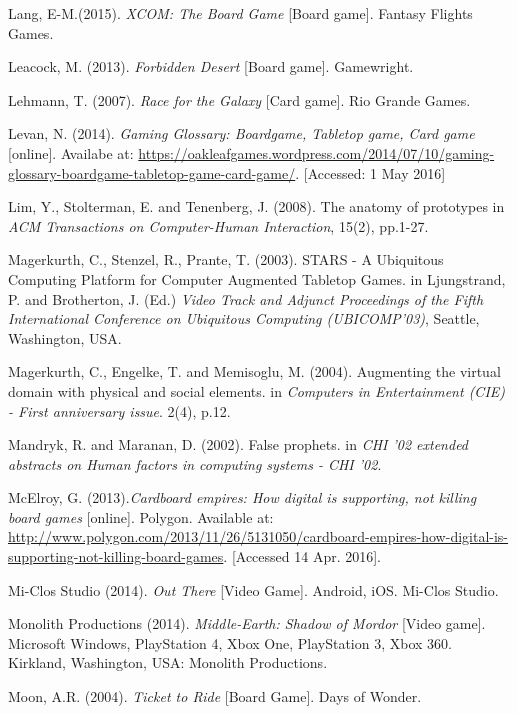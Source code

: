 \documentclass[a4paper,11pt]{report}
\begin{document}
\begin{thebibliography}{1}
Lang, E-M.(2015). \textit{XCOM: The Board Game} [Board game]. Fantasy Flights Games.

Leacock, M. (2013). \textit{Forbidden Desert} [Board game].  Gamewright.

Lehmann, T. (2007). \textit{Race for the Galaxy} [Card game]. Rio Grande Games.

Levan, N. (2014). \textit{Gaming Glossary: Boardgame, Tabletop game, Card game} [online]. Availabe at: \url{https://oakleafgames.wordpress.com/2014/07/10/gaming-glossary-boardgame-tabletop-game-card-game/}. [Accessed: 1 May 2016]

Lim, Y., Stolterman, E. and Tenenberg, J. (2008). The anatomy of prototypes in \textit{ACM Transactions on Computer-Human Interaction}, 15(2), pp.1-27.

Magerkurth, C., Stenzel, R., Prante, T. (2003). STARS - A Ubiquitous Computing Platform for Computer Augmented Tabletop Games. in Ljungstrand, P. and Brotherton, J. (Ed.) \textit{Video Track and Adjunct Proceedings of the Fifth
International Conference on Ubiquitous Computing (UBICOMP’03)}, Seattle, Washington, USA.

Magerkurth, C., Engelke, T. and Memisoglu, M. (2004). Augmenting the virtual domain with physical and social elements. in \textit{Computers in Entertainment (CIE) - First anniversary issue}. 2(4), p.12. 

Mandryk, R. and Maranan, D. (2002). False prophets. in \textit{CHI '02 extended abstracts on Human factors in computing systems - CHI '02}.

McElroy, G. (2013).\textit{Cardboard empires: How digital is supporting, not killing board games} [online]. Polygon. Available at: \url{http://www.polygon.com/2013/11/26/5131050/cardboard-empires-how-digital-is-supporting-not-killing-board-games}. [Accessed 14 Apr. 2016].

Mi-Clos Studio (2014). \textit{Out There} [Video Game]. Android, iOS. Mi-Clos Studio.

Monolith Productions (2014). \textit{Middle-Earth: Shadow of Mordor} [Video game]. Microsoft Windows, PlayStation 4, Xbox One, PlayStation 3, Xbox 360. Kirkland, Washington, USA: Monolith Productions.

Moon, A.R. (2004). \textit{Ticket to Ride} [Board Game]. Days of Wonder.


\end{thebibliography}
\end{document}
